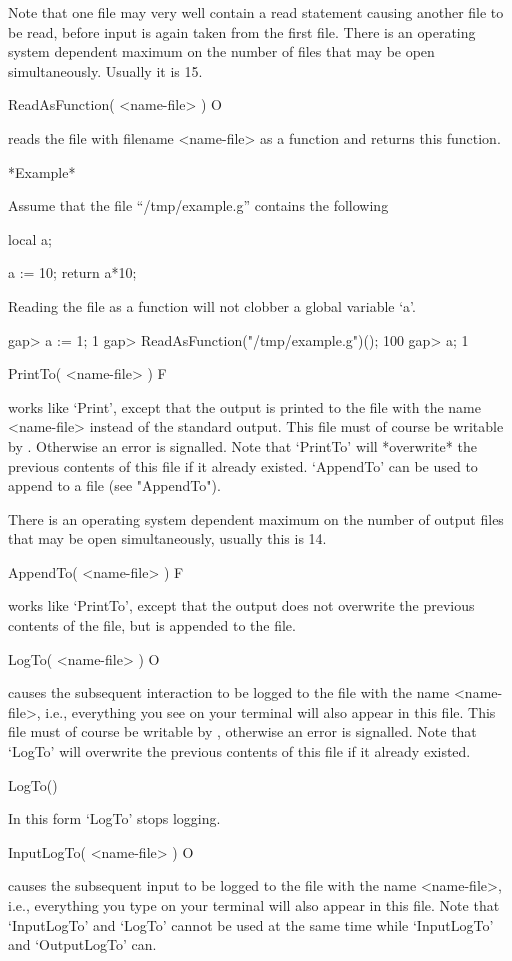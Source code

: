 Note that one file may very well contain a read statement causing another
file to be read, before input is again taken from the  first file.  There
is an operating system dependent maximum on the  number of files that may
be open simultaneously.  Usually it is 15.

\>ReadAsFunction( <name-file> ) O

reads the  file  with filename <name-file> as a function and returns this
function.

*Example*

Assume that the file ``/tmp/example.g'' contains the following

\begintt
local a;

a := 10;
return a*10;
\endtt

Reading the file as a function will not clobber a global variable `a'.

\begintt
gap> a := 1;
1
gap> ReadAsFunction("/tmp/example.g")();
100
gap> a;
1
\endtt

\>PrintTo( <name-file> ) F

works like `Print',  except that the output  is printed to the  file with
the name <name-file>  instead of the standard output.   This file must of
course be writable by {\GAP}.  Otherwise an error is signalled. Note that
`PrintTo' will  *overwrite*  the  previous contents  of  this file  if it
already existed.  `AppendTo'  can   be used to   append to  a file   (see
"AppendTo").
    
There is an  operating system dependent maximum  on the number  of output
files that may be open simultaneously, usually this is 14.

\>AppendTo( <name-file> ) F

works like `PrintTo',  except  that the   output does  not overwrite  the
previous contents of the file, but is appended to the file.

\>LogTo( <name-file> ) O

causes the subsequent interaction to be logged  to the file with the name
<name-file>, i.e., everything you  see on your  terminal will also appear
in this file.
This file must of course be writable  by {\GAP}, otherwise an error is
signalled.  Note  that   `LogTo'  will overwrite the   previous
contents of this file if it already existed.

\)LogTo()

In this form `LogTo' stops logging.

\>InputLogTo( <name-file> ) O

causes the  subsequent  input to be   logged to the   file with  the name
<name-file>, i.e., everything you type  on your terminal will also appear
in this file.  Note that `InputLogTo'  and `LogTo' cannot  be used at the
same time while `InputLogTo' and `OutputLogTo' can.

